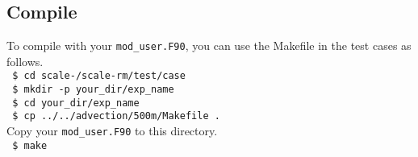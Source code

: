 \subsection{Compile}

To compile \scalerm with your \verb|mod_user.F90|, you can use the Makefile in the test cases as follows.\\
\texttt{ \$ cd scale-\version/scale-rm/test/case}\\
\texttt{ \$ mkdir -p your\_dir/exp\_name}\\
\texttt{ \$ cd your\_dir/exp\_name}\\
\texttt{ \$ cp ../../advection/500m/Makefile .}\\
Copy your \verb|mod_user.F90| to this directory.\\
\texttt{ \$ make}
